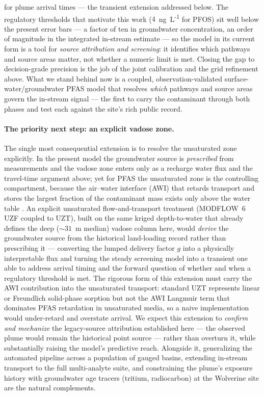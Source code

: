 for plume arrival times --- the transient extension addressed below. The regulatory thresholds that motivate
this work ($4$~ng~L\textsuperscript{-1} for PFOS) sit well below the present error bars --- a factor
of ten in groundwater concentration, an order of magnitude in the integrated in-stream estimate ---
so the model in its current form is a tool for \emph{source attribution and screening}: it identifies
which pathways and source areas matter, not whether a numeric limit is met. Closing the gap to
decision-grade precision is the job of the joint calibration and the grid refinement above. What we
stand behind now is a coupled, observation-validated surface-water/groundwater PFAS model that resolves
\emph{which} pathways and source areas govern the in-stream signal --- the first to carry the
contaminant through both phases and test each against the site's rich public record.

\paragraph{The priority next step: an explicit vadose zone.} The single most consequential extension is
to resolve the unsaturated zone explicitly. In the present model the groundwater source is
\emph{prescribed} from measurements and the vadose zone enters only as a recharge water flux and the
travel-time argument above; yet for PFAS the unsaturated zone is the controlling compartment, because the
air--water interface (AWI) that retards transport and stores the largest fraction of the contaminant mass
exists only above the water table \citep{costanza2019, brusseau2018, guo2020}. An explicit unsaturated
flow-and-transport treatment (MODFLOW~6 UZF coupled to UZT), built on the same kriged depth-to-water that
already defines the deep ($\sim$$31$~m median) vadose column here, would \emph{derive} the groundwater
source from the historical land-loading record rather than prescribing it --- converting the lumped
delivery factor $g$ into a physically interpretable flux and turning the steady screening model into a
transient one able to address arrival timing and the forward question of whether and when a regulatory
threshold is met. The rigorous form of this extension must carry the AWI contribution into the
unsaturated transport: standard UZT represents linear or Freundlich solid-phase sorption but not the
AWI Langmuir term that dominates PFAS retardation in unsaturated media, so a naive implementation would
under-retard and overstate arrival. We expect this extension to \emph{confirm and mechanize} the
legacy-source attribution established here --- the observed plume would remain the historical point source
--- rather than overturn it, while substantially raising the model's predictive reach. Alongside it,
generalizing the automated pipeline across a population of gauged basins, extending in-stream transport to
the full multi-analyte suite, and constraining the plume's exposure history with groundwater age tracers
(tritium, radiocarbon) at the Wolverine site are the natural complements.
